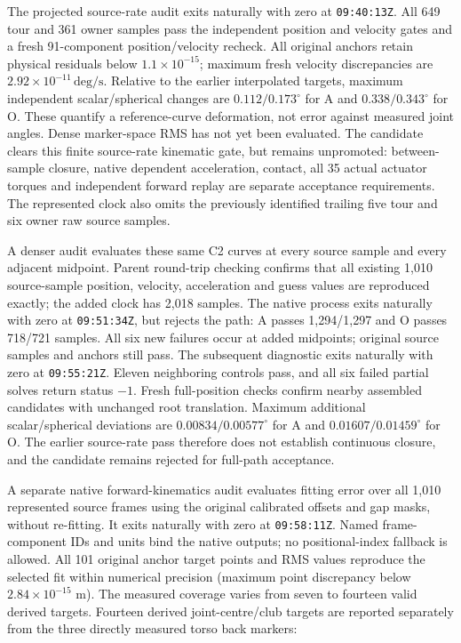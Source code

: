\documentclass[11pt,a4paper]{article}
\begin{document}
The projected source-rate audit exits naturally with zero at
\texttt{09:40:13Z}. All 649 tour and 361 owner samples pass the independent
position and velocity gates and a fresh 91-component position/velocity
recheck. All original anchors retain physical residuals below
\(1.1\times10^{-15}\); maximum fresh velocity discrepancies are
\(2.92\times10^{-11}\,\mathrm{deg/s}\). Relative to the earlier interpolated
targets, maximum independent scalar/spherical changes are
\(0.112/0.173^{\circ}\) for A and \(0.338/0.343^{\circ}\) for O.
These quantify a reference-curve deformation, not error against measured
joint angles. Dense marker-space RMS has not yet been evaluated.
The candidate clears this finite source-rate kinematic gate, but remains
unpromoted: between-sample closure, native dependent acceleration, contact,
all 35 actual actuator torques and independent forward replay are separate
acceptance requirements. The represented clock also omits the previously
identified trailing five tour and six owner raw source samples.

A denser audit evaluates these same C2 curves at every source sample and
every adjacent midpoint. Parent round-trip checking confirms that all
existing 1,010 source-sample position, velocity, acceleration and guess
values are reproduced exactly; the added clock has 2,018 samples. The native
process exits naturally with zero at \texttt{09:51:34Z}, but rejects the
path: A passes 1,294/1,297 and O passes 718/721 samples. All six new failures
occur at added midpoints; original source samples and anchors still pass.
The subsequent diagnostic exits naturally with zero at
\texttt{09:55:21Z}. Eleven neighboring controls pass, and all six failed
partial solves return status $-1$. Fresh full-position checks confirm nearby
assembled candidates with unchanged root translation. Maximum additional
scalar/spherical deviations are \(0.00834/0.00577^{\circ}\) for A and
\(0.01607/0.01459^{\circ}\) for O. The earlier source-rate pass therefore
does not establish continuous closure, and the candidate remains rejected
for full-path acceptance.

A separate native forward-kinematics audit evaluates fitting error over all
1,010 represented source frames using the original calibrated offsets and
gap masks, without re-fitting. It exits naturally with zero at
\texttt{09:58:11Z}. Named frame-component IDs and units bind the native
outputs; no positional-index fallback is allowed. All 101 original anchor
target points and RMS values reproduce the selected fit within numerical
precision (maximum point discrepancy below \(2.84\times10^{-15}\) m).
The measured coverage varies from seven to fourteen valid derived targets.
Fourteen derived joint-centre/club targets are reported separately from the
three directly measured torso back markers:
\end{document}
